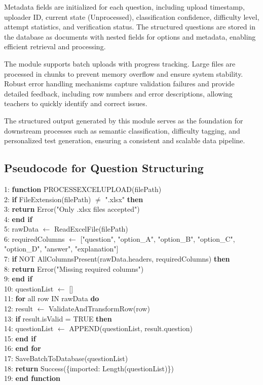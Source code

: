 \begin{sloppypar}
Metadata fields are initialized for each question, including upload timestamp, uploader ID, current state (Unprocessed), classification confidence, difficulty level, attempt statistics, and verification status. The structured questions are stored in the database as documents with nested fields for options and metadata, enabling efficient retrieval and processing.

The module supports batch uploads with progress tracking. Large files are processed in chunks to prevent memory overflow and ensure system stability. Robust error handling mechanisms capture validation failures and provide detailed feedback, including row numbers and error descriptions, allowing teachers to quickly identify and correct issues.

The structured output generated by this module serves as the foundation for downstream processes such as semantic classification, difficulty tagging, and personalized test generation, ensuring a consistent and scalable data pipeline.

\subsection{Pseudocode for Question Structuring}

1: \textbf{function} PROCESSEXCELUPLOAD(filePath)\\
2: \quad \textbf{if} FileExtension(filePath) $\neq$ ".xlsx" \textbf{then}\\
3: \qquad \textbf{return} Error("Only .xlsx files accepted")\\
4: \quad \textbf{end if}\\
5: \quad rawData $\leftarrow$ ReadExcelFile(filePath)\\
6: \quad requiredColumns $\leftarrow$ ["question", "option\_A", "option\_B", "option\_C", "option\_D", "answer", "explanation"]\\
7: \quad \textbf{if} NOT AllColumnsPresent(rawData.headers, requiredColumns) \textbf{then}\\
8: \qquad \textbf{return} Error("Missing required columns")\\
9: \quad \textbf{end if}\\
10: \quad questionList $\leftarrow$ []\\
11: \quad \textbf{for} all row IN rawData \textbf{do}\\
12: \qquad result $\leftarrow$ ValidateAndTransformRow(row)\\
13: \qquad \textbf{if} result.isValid = TRUE \textbf{then}\\
14: \qquad\quad questionList $\leftarrow$ APPEND(questionList, result.question)\\
15: \qquad \textbf{end if}\\
16: \quad \textbf{\textbf{end for}}\\
17: \quad SaveBatchToDatabase(questionList)\\
18: \quad \textbf{return} Success(\{imported: Length(questionList)\})\\
19: \textbf{end function}
\algofooter


\end{sloppypar}

